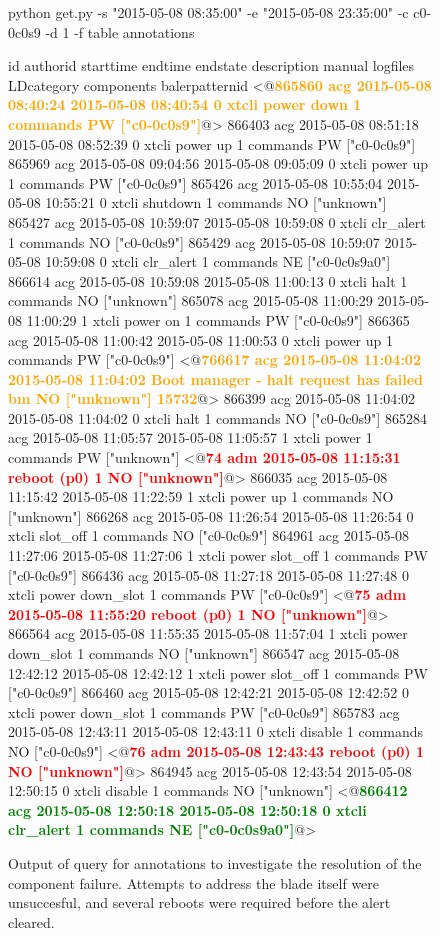 \begin{figure*}
\begin{annol}
python get.py -s "2015-05-08 08:35:00" -e "2015-05-08 23:35:00" -c c0-0c0s9 -d 1 -f table annotations

id	authorid	starttime	endtime		endstate	description	manual	logfiles	LDcategory	components	balerpatternid
<@\textbf{\textcolor{orange}{865860	acg	2015-05-08 08:40:24	2015-05-08 08:40:54	0	xtcli power down	1	commands	PW	["c0-0c0s9"]}}@>
866403	acg	2015-05-08 08:51:18	2015-05-08 08:52:39	0	xtcli power up	1	commands	PW	["c0-0c0s9"]
865969	acg	2015-05-08 09:04:56	2015-05-08 09:05:09	0	xtcli power up	1	commands	PW	["c0-0c0s9"]
865426	acg	2015-05-08 10:55:04	2015-05-08 10:55:21	0	xtcli shutdown	1	commands	NO	["unknown"]
865427	acg	2015-05-08 10:59:07	2015-05-08 10:59:08	0	xtcli clr_alert	1	commands	NO	["c0-0c0s9"]
865429	acg	2015-05-08 10:59:07	2015-05-08 10:59:08	0	xtcli clr_alert	1	commands	NE	["c0-0c0s9a0"]
866614	acg	2015-05-08 10:59:08	2015-05-08 11:00:13	0	xtcli halt	1	commands	NO	["unknown"]
865078	acg	2015-05-08 11:00:29	2015-05-08 11:00:29	1	xtcli power on	1	commands	PW	["c0-0c0s9"]
866365	acg	2015-05-08 11:00:42	2015-05-08 11:00:53	0	xtcli power up	1	commands	PW	["c0-0c0s9"]
<@\textbf{\textcolor{orange}{766617	acg	2015-05-08 11:04:02	2015-05-08 11:04:02		Boot manager - halt request has failed		bm	NO	["unknown"]	15732}}@>
866399	acg	2015-05-08 11:04:02	2015-05-08 11:04:02	0	xtcli halt	1	commands	NO	["c0-0c0s9"]
865284	acg	2015-05-08 11:05:57	2015-05-08 11:05:57	1	xtcli power	1	commands	PW	["unknown"]
<@\textbf{\textcolor{red}{74	adm	2015-05-08 11:15:31		reboot (p0)	1			NO	["unknown"]}}@>
866035	acg	2015-05-08 11:15:42	2015-05-08 11:22:59	1	xtcli power up	1	commands	NO	["unknown"]
866268	acg	2015-05-08 11:26:54	2015-05-08 11:26:54	0	xtcli slot_off	1	commands	NO	["c0-0c0s9"]
864961	acg	2015-05-08 11:27:06	2015-05-08 11:27:06	1	xtcli power slot_off	1	commands	PW	["c0-0c0s9"]
866436	acg	2015-05-08 11:27:18	2015-05-08 11:27:48	0	xtcli power down_slot	1	commands	PW	["c0-0c0s9"]
<@\textbf{\textcolor{red}{75	adm	2015-05-08 11:55:20		reboot (p0)	1		NO	["unknown"]}}@>
866564	acg	2015-05-08 11:55:35	2015-05-08 11:57:04	1	xtcli power down_slot	1	commands	NO	["unknown"]
866547	acg	2015-05-08 12:42:12	2015-05-08 12:42:12	1	xtcli power slot_off	1	commands	PW	["c0-0c0s9"]
866460	acg	2015-05-08 12:42:21	2015-05-08 12:42:52	0	xtcli power down_slot	1	commands	PW	["c0-0c0s9"]
865783	acg	2015-05-08 12:43:11	2015-05-08 12:43:11	0	xtcli disable	1	commands	NO	["c0-0c0s9"]
<@\textbf{\textcolor{red}{76	adm	2015-05-08 12:43:43		reboot (p0)	1			NO	["unknown"]}}@>
864945	acg	2015-05-08 12:43:54	2015-05-08 12:50:15	0	xtcli disable	1	commands	NO	["unknown"]
<@\textbf{\textcolor{green}{866412	acg	2015-05-08 12:50:18	2015-05-08 12:50:18	0	xtcli clr\_alert	1	commands	NE	["c0-0c0s9a0"]}}@>
\end{annol}
\caption{Output of query for annotations to investigate the resolution of the component failure. Attempts to address the blade itself were unsuccesful,
and several reboots were required before the alert cleared.}
\label{f:routeresolution}
\end{figure*}




